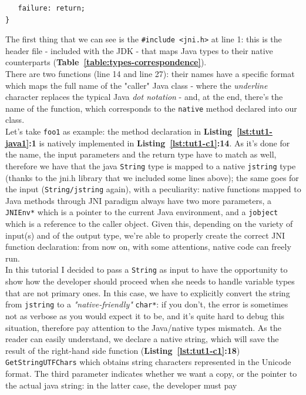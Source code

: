 \documentclass[a4paper,10pt]{article}
\newcommand{\keyword}[1]{\texttt{#1}}
\newcommand{\reft}[1]{\textbf{Table~\ref{#1}}}
\newcommand{\refl}[1]{\textbf{Listing~\ref{#1}}}
\begin{document}
\begin{multicols}{2}
\begin{lstlisting}
   failure: return;
}
\end{lstlisting}
The first thing that we can see is the \keyword{\#include <jni.h>} at line 1:
this is the header file - included with the JDK - that maps Java types to their
native counterparts (\reft{table:types-correspondence}).\\
There are two functions (line 14 and line 27): their names have a specific
format which maps the full name of the "caller" Java class - where the
\textit{underline} character replaces the typical Java \textit{dot notation} - 
and, at the end, there's the name of the function, which corresponds to the
\keyword{native} method declared into our class.\\
Let's take \keyword{foo1} as example: the method declaration in
\refl{lst:tut1-java1}\textbf{:1} is natively implemented in
\refl{lst:tut1-c1}\textbf{:14}. As it's done for the name, the input parameters
and the return type have to match as well, therefore we have that the java
\keyword{String} type is mapped to a native \keyword{jstring} type (thanks to
the jni.h library that we included some lines above); the same goes for the
input (\keyword{String/jstring} again), with a peculiarity: native functions
mapped to Java methods through JNI paradigm always have two more parameters, a
\keyword{JNIEnv*} which is a pointer to the current Java environment, and a
\keyword{jobject} which is a reference to the caller object. Given this, 
depending on the variety of input(s) and of the output type, we're able to
properly create the correct JNI function declaration: from now on, with some
attentions, native code can freely run.\\
In this tutorial I decided to pass a \keyword{String} as input to have the
opportunity to show how the developer should proceed when she needs to handle
variable types that are not primary ones. In this case, we have to explicitly
convert the string from \keyword{jstring} to a \textit{"native-friendly"}
\keyword{char*}: if you don't, the error is sometimes not as verbose as you
would expect it to be, and it's quite hard to debug this situation, therefore
pay attention to the Java/native types mismatch. As the reader can easily
understand, we declare a native string, which will save the result of the
right-hand side function (\refl{lst:tut1-c1}\textbf{:18})
\keyword{GetStringUTFChars} which obtains string characters represented in the
Unicode format. The third parameter indicates whether we want a copy, or the
pointer to the actual java string: in the latter case, the developer must pay

\end{multicols}
\end{document}
